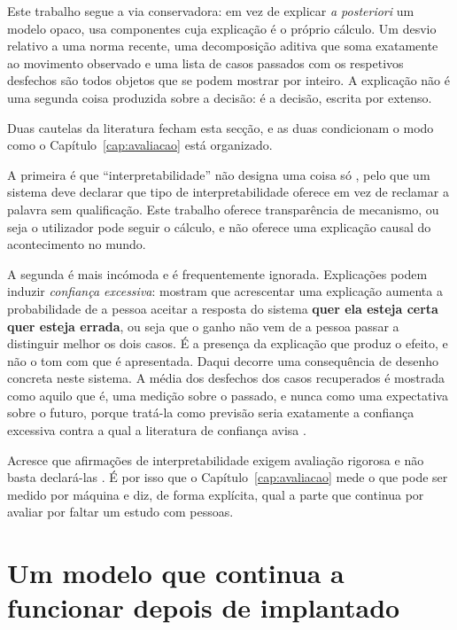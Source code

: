 Este trabalho segue a via conservadora: em vez de explicar \emph{a posteriori} um modelo opaco, usa
componentes cuja explicação é o próprio cálculo. Um desvio relativo a uma norma recente, uma
decomposição aditiva que soma exatamente ao movimento observado e uma lista de casos passados com os
respetivos desfechos são todos objetos que se podem mostrar por inteiro. A explicação não é uma
segunda coisa produzida sobre a decisão: é a decisão, escrita por extenso.

Duas cautelas da literatura fecham esta secção, e as duas condicionam o modo como o
Capítulo~\ref{cap:avaliacao} está organizado.

A primeira é que ``interpretabilidade'' não designa uma coisa só \autocite{lipton2018mythos}, pelo
que um sistema deve declarar que tipo de interpretabilidade oferece em vez de reclamar a palavra sem
qualificação. Este trabalho oferece transparência de mecanismo, ou seja o utilizador pode seguir o
cálculo, e não oferece uma explicação causal do acontecimento no mundo.

A segunda é mais incómoda e é frequentemente ignorada. Explicações podem induzir
\emph{confiança excessiva}: \textcite{bansal2021whole} mostram que acrescentar uma explicação
aumenta a probabilidade de a pessoa aceitar a resposta do sistema \textbf{quer ela esteja certa quer
esteja errada}, ou seja que o ganho não vem de a pessoa passar a distinguir melhor os dois casos. É
a presença da explicação que produz o efeito, e não o tom com que é apresentada. Daqui decorre uma
consequência de desenho concreta neste sistema. A média dos desfechos dos casos recuperados é
mostrada como aquilo que é, uma medição sobre o passado, e nunca como uma expectativa sobre o futuro,
porque tratá-la como previsão seria exatamente a confiança excessiva contra a qual a literatura de
confiança avisa \autocite{lee2004trust, bansal2021whole}.

Acresce que afirmações de interpretabilidade exigem avaliação rigorosa e não basta declará-las
\autocite{doshivelez2017rigorous}. É por isso que o Capítulo~\ref{cap:avaliacao} mede o que pode ser
medido por máquina e diz, de forma explícita, qual a parte que continua por avaliar por faltar um
estudo com pessoas.

\section{Um modelo que continua a funcionar depois de implantado}
\label{sec:ctx_producao}

